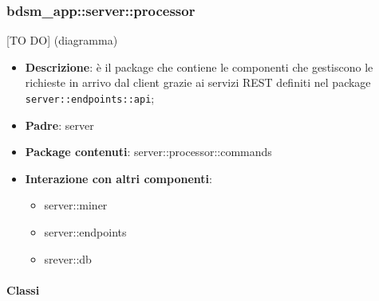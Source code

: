 


\subsubsection{bdsm\_app::server::processor} %
\label{ssub:bdsm_app_server_processor}
[TO DO] (diagramma) \newline \newline

\begin{itemize}
  \item \textbf{Descrizione}: è il package che contiene le componenti che gestiscono le richieste in arrivo dal client grazie ai servizi REST definiti nel package \texttt{server::endpoints::api};
  \item \textbf{Padre}: server
  \item \textbf{Package contenuti}: server::processor::commands
  \item \textbf{Interazione con altri componenti}:
    \begin{itemize}
      \item server::miner
      \item server::endpoints
      \item srever::db
    \end{itemize}
\end{itemize}

  \paragraph{Classi} %

